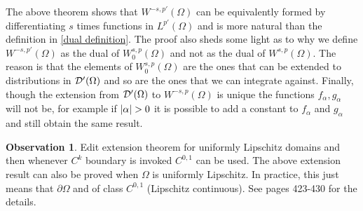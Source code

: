 \documentclass[12pt]{article}
\theoremstyle{definition}
\newtheorem{observation}{Observation}
\begin{document}
The above theorem shows that $W^{-s,p'}(\Omega )$ can be equivalently formed by differentiating $s$ times functions in $L^{p'}(\Omega )$ and is more natural than the definition in \eqref{dual definition}. The proof also sheds some light as to why we define $W^{-s,p'}(\Omega )$ as the dual of $W^{s,p}_0(\Omega )$ and not as the dual of $W^{s,p}(\Omega )$. The reason is that the elements of $W^{s,p}_0(\Omega )$ are the ones that can be extended to distributions in $\mathcal{D}'(\Omega )$ and so are the ones that we can integrate against. Finally, though the extension from $\mathcal{D}'(\Omega )$ to $W^{-s,p}(\Omega )$ is unique the functions $f_\alpha, g_\alpha$ will not be, for example if $\abs{\alpha}>0$ it is possible to add a constant to $f_\alpha$ and $g_\alpha$ and still obtain the same result.

\begin{observation}
  Edit extension theorem for uniformly Lipschitz domains and then whenever $C^k$ boundary is invoked $C^{0,1}$ can be used.	The above extension result can also be proved when $\Omega$ is uniformly Lipschitz. In practice, this just means that $\partial\Omega$ and of class $C^{0,1}$ (Lipschitz continuous). See \cite{leoni2017first} pages 423-430 for the details.
\end{observation}










\end{document}
